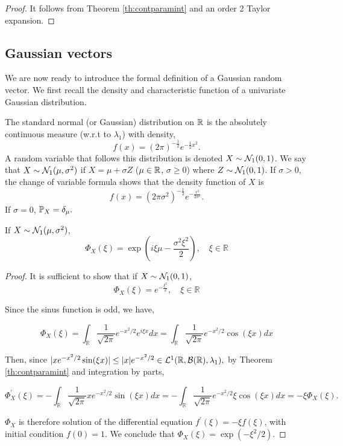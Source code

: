 \documentclass{article}
\begin{document}
\begin{proof}
  It follows from Theorem \ref{th:contparamint} and an order 2 Taylor expansion. 
\end{proof}

\subsection{Gaussian vectors}

We are now ready to introduce the formal definition of a Gaussian random vector.
We first recall the density and characteristic function of a univariate Gaussian distribution.

\begin{definition} The standard normal (or Gaussian) distribution on $\R$ is the
  absolutely continuous measure (w.r.t to $\lambda_1$) with density, $$f(x)=(2
  \pi)^{-\frac{1}{2}} e^{-\frac{1}{2}x^{2}}.$$
  A random variable that follows this distribution is denoted $X \sim
  \cN_1(0,1)$. We say that $X \sim \cN_1(\mu,\sigma^2)$ if $X = \mu + \sigma Z$
  ($\mu \in \R$, $\sigma \geq 0$) where  $Z \sim \cN_1(0,1)$. If $\sigma >0$,
  the change of variable formula shows that the density function of $X$ is $$f(x)=(2
  \pi\sigma^2)^{-\frac{1}{2}} e^{-\frac{x^2}{2\sigma^2}}.$$ If $\sigma = 0$, $\P_X = \delta_{\mu}.$
\end{definition}

\begin{prop} \label{prop:uni_charac_gaussian} If $X \sim \cN_1(\mu,\sigma^2)$,
  $$
  \Phi_{X}(\xi)=\exp \left(i\xi \mu -\frac{\sigma^{2} \xi^{2}}{2}\right), \quad \xi \in \mathbb{R}
  $$
\end{prop}

\begin{proof}
  It is sufficient to show that if  $X \sim \cN_1(0,1)$,
  $$
  \Phi_{X}(\xi)=e^{-\frac{\xi^{2}}{2}}, \quad \xi \in \mathbb{R}
  $$

  Since the sinus function is odd, we have, 

  \begin{equation*}
    \Phi_{X}(\xi)= \int_{\mathbb{R}} \frac{1}{\sqrt{2 \pi}} e^{-x^{2} /2} e^{i \xi x} d x = \int_{\mathbb{R}} \frac{1}{\sqrt{2 \pi}} e^{-x^{2} /2} \cos(\xi x) d x
  \end{equation*}

Then, since $| x e^{-x^{2} / 2} \sin (\xi x)| \leq |x| e^{-x^{2} / 2} \in \mathcal{L}^{1}(\R, \cB(\R), \lambda_1),$ by Theorem \ref{th:contparamint}
  and integration by parts,

  \begin{equation*}
    \Phi_X^{\prime}(\xi)=-\int_{\mathbb{R}} \frac{1}{\sqrt{2 \pi}} x e^{-x^{2} / 2} \sin (\xi x) d x = -\int_{\mathbb{R}} \frac{1}{\sqrt{2 \pi}} e^{-x^{2} / 2} \xi \cos (\xi x) d x=-\xi \Phi_X(\xi).
  \end{equation*}

  $\Phi_X$ is therefore solution of the differential equation
  $f^{\prime}(\xi)=-\xi f(\xi)$, with initial condition $f(0)=1$. We conclude
  that $\Phi_X(\xi)=\exp \left(-\xi^{2} / 2\right)$.
\end{proof}
\end{document}
